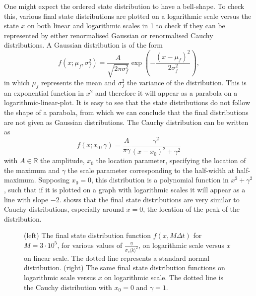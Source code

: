 One might expect the ordered state distribution to have a bell-shape. To check this, various final state distributions are plotted on a logarithmic scale versus the state $x$ on both linear and logarithmic scales in \cref{fig:cont_mean_field_linlog_loglog} to check if they can be represented by either renormalised Gaussian or renormalised Cauchy distributions. A Gaussian distribution is of the form
\begin{equation}
f(x; \mu_f, \sigma_f^2) = \frac{A}{\sqrt{2\pi\sigma_f^2}} \exp{\left(-\frac{(x-\mu_f)^2}{2\sigma_f^2}\right)},
\label{eq:gaussian_fit}
\end{equation}
in which $\mu_f$ represents the mean and $\sigma_f^2$ the variance of the distribution. This is an exponential function in $x^2$ and therefore it will appear as a parabola on a logarithmic-linear-plot. It is easy to see that the state distributions do not follow the shape of a parabola, from which we can conclude that the final distributions are not given as Gaussian distributions. The Cauchy distribution can be written as
\begin{equation}
f(x; x_0, \gamma) = \frac{A}{\pi \gamma} \frac{\gamma^2}{(x-x_0)^2+\gamma^2} 
\label{eq:cauchy_fit}
\end{equation}
with $A \in \mathbb{R}$ the amplitude, $x_0$ the location parameter, specifying the location of the maximum and $\gamma$ the scale parameter corresponding to the half-width at half-maximum. Supposing $x_0=0$, this distribution is a polynomial function in $x^2 + \gamma^2$, such that if it is plotted on a graph with logarithmic scales it will appear as a line with slope $-2$.  shows that the final state distributions are very similar to Cauchy distributions, especially around $x=0$, the location of the peak of the distribution.
\begin{figure}[tbp]
	\centering
	\caption{(left) The final state distribution function $f(x,M\Delta t)$ for $M=3\cdot 10^5$, for various values of $\frac{\eta}{\sigma_c\langle k \rangle^2}$, on logarithmic scale versus $x$ on linear scale. The dotted line represents a standard normal distribution. (right) The same final state distribution functions on logarithmic scale versus $x$ on logarithmic scale. The dotted line is the Cauchy distribution with $x_0=0$ and $\gamma=1$.}	
	\label{fig:cont_mean_field_linlog_loglog}
\end{figure}

